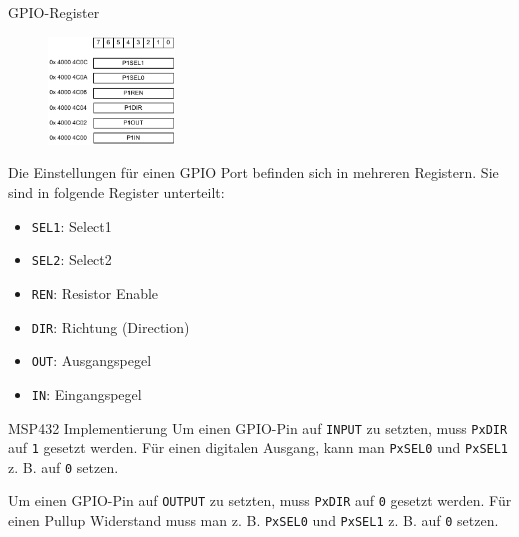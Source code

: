 \begin{defi}{GPIO-Register}
    \begin{figure}
        \begin{center}
            \includegraphics[width=0.3\textwidth]{includes/figures/defi_msp432_port.pdf}
        \end{center}
    \end{figure}

    Die Einstellungen für einen GPIO Port befinden sich in mehreren Registern.
    Sie sind in folgende Register unterteilt:
    \begin{itemize}
        \item \texttt{SEL1}: Select1
        \item \texttt{SEL2}: Select2
        \item \texttt{REN}: Resistor Enable
        \item \texttt{DIR}: Richtung (Direction)
        \item \texttt{OUT}: Ausgangspegel
        \item \texttt{IN}: Eingangspegel
    \end{itemize}
\end{defi}

\begin{bonus}{MSP432 Implementierung}
    Um einen GPIO-Pin auf \texttt{INPUT} zu setzten, muss \texttt{PxDIR} auf \texttt{1} gesetzt werden.
    Für einen digitalen Ausgang, kann man \texttt{PxSEL0} und \texttt{PxSEL1} z. B. auf \texttt{0} setzen.

    Um einen GPIO-Pin auf \texttt{OUTPUT} zu setzten, muss \texttt{PxDIR} auf \texttt{0} gesetzt werden.
    Für einen Pullup Widerstand muss man z. B. \texttt{PxSEL0} und \texttt{PxSEL1} z. B. auf \texttt{0} setzen.
\end{bonus}

